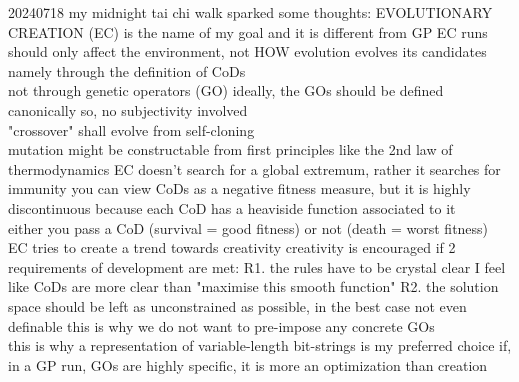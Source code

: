 \documentclass{article}\usepackage[margin=2cm]{geometry}
\begin{document}
\begin{cascade}
    20240718
    \stepin
    my midnight tai chi walk sparked some thoughts:
    \stepin
    EVOLUTIONARY CREATION (EC) is the name of my goal and it is different from GP
    \stepin
    EC runs should only affect the environment, not HOW evolution evolves its candidates
    \stepin
    namely through the definition of CoDs\\
    not through genetic operators (GO)
    \stepin
    ideally, the GOs should be defined canonically
    \stepin
    so, no subjectivity involved\\
    "crossover" shall evolve from self-cloning\\
    mutation might be constructable from first principles
    \stepin
    like the 2nd law of thermodynamics
    \stepout
    \stepout
    \stepout
    \stepout
    EC doesn't search for a global extremum, rather it searches for immunity
    \stepin
    you can view CoDs as a negative fitness measure, but it is highly discontinuous
    \stepin
    because each CoD has a heaviside function associated to it\\
    either you pass a CoD (survival = good fitness) or not (death = worst fitness)
    \stepout
    \stepout
    EC tries to create a trend towards creativity 
    \stepin
    creativity is encouraged if 2 requirements of development are met:
    \stepin
    R1. the rules have to be crystal clear
    \stepin
    I feel like CoDs are more clear than "maximise this smooth function"
    \stepout
    R2. the solution space should be left as unconstrained as possible, in the best case not even definable
    \stepin
    this is why we do not want to pre-impose any concrete GOs\\
    this is why a representation of variable-length bit-strings is my preferred choice
    \stepout
    \stepout
    \stepout
    \stepout
    if, in a GP run, GOs are highly specific, it is more an optimization than creation
\end{cascade}
\end{document}
